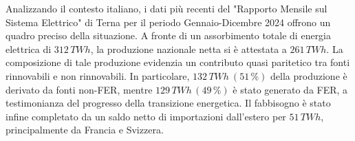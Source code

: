 


        
    
    
    
    






\newpage
Analizzando il contesto italiano, i dati più recenti del "Rapporto Mensile sul Sistema Elettrico" di Terna per il periodo Gennaio-Dicembre 2024 \cite{TernaRapporto2024} offrono un quadro preciso della situazione. A fronte di un assorbimento totale di energia elettrica di $312\,TWh$, la produzione nazionale netta si è attestata a $261\,TWh$. La composizione di tale produzione evidenzia un contributo quasi paritetico tra fonti rinnovabili e non rinnovabili. In particolare, $132\,TWh\ (51\,\%)$ della produzione è derivato da fonti non-FER, mentre $129\,TWh\,(49\,\%)$ è stato generato da FER, a testimonianza del progresso della transizione energetica. Il fabbisogno è stato infine completato da un saldo netto di importazioni dall'estero per $51\,TWh$, principalmente da Francia e Svizzera.



